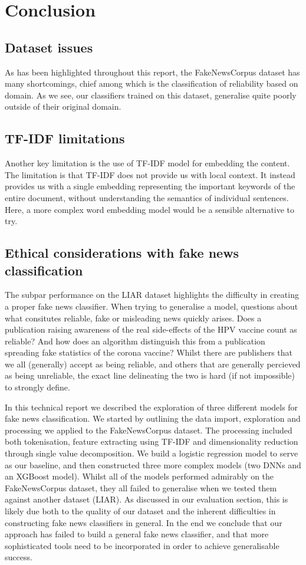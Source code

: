 \section{Conclusion}

\subsection{Dataset issues}
As has been highlighted throughout this report, the FakeNewsCorpus dataset has many shortcomings, chief among which is
the classification of reliability based on domain. As we see, our classifiers trained on this dataset, generalise quite
poorly outside of their original domain.

\subsection{TF-IDF limitations}
Another key limitation is the use of TF-IDF model for embedding the content. The limitation is that TF-IDF does
not provide us with local context. It instead provides us with a single embedding representing the important keywords of the
entire document, without understanding the semantics of individual sentences. Here, a more complex word embedding model
would be a sensible alternative to try.

\subsection{Ethical considerations with fake news classification}
The subpar performance on the LIAR dataset highlights the difficulty in creating a proper fake news classifier. When trying to
generalise a model, questions about what consitutes reliable, fake or misleading news quickly arises. Does a publication raising awareness
of the real side-effects of the HPV vaccine count as reliable? And how does an algorithm distinguish this from a
publication spreading fake statistics of the corona vaccine? Whilst there are publishers that we all (generally)
accept as being reliable, and others that are generally percieved as being unreliable, the exact line delineating the
two is hard (if not impossible) to strongly define.


In this technical report we described the exploration of three different models for fake news classification. We started
by outlining the data import, exploration and processing we applied to the FakeNewsCorpus dataset. The processing
included both tokenisation, feature extracting using TF-IDF and dimensionality reduction through single value
decomposition. We build a logistic regression model to serve as our baseline, and then constructed three more complex
models (two DNNs and an XGBoost model). Whilst all of the models performed admirably on the FakeNewsCorpus dataset, they
all failed to generalise when we tested them against another dataset (LIAR). As discussed in our evaluation section,
this is likely due both to the quality of our dataset and the inherent difficulties in constructing fake news
classifiers in general. In the end we conclude that our approach has failed to build a general fake news classifier, and
that more sophisticated tools need to be incorporated in order to achieve generalisable success.


